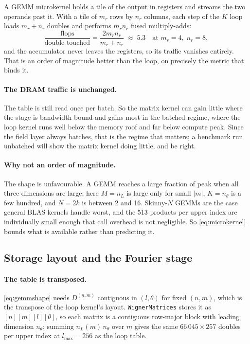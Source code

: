 \documentclass[11pt,a4paper]{article}
\newcommand{\code}[1]{\texttt{#1}}
\begin{document}
A GEMM microkernel holds a tile of the output in registers and streams the
two operands past it.  With a tile of $m_r$ rows by $n_r$ columns, each
step of the $K$ loop loads $m_r + n_r$ doubles and performs $m_r n_r$
fused multiply-adds:
\begin{equation}
  \frac{\text{flops}}{\text{double touched}}
    = \frac{2 m_r n_r}{m_r + n_r}
    \;\approx\; 5.3 \quad\text{at } m_r=4,\; n_r=8,
  \label{eq:microkernel}
\end{equation}
and the accumulator never leaves the registers, so its traffic vanishes
entirely.  That is an order of magnitude better than the loop, on
precisely the metric that binds it.

\paragraph{The DRAM traffic is unchanged.}  The table is still read once
per batch.  So the matrix kernel can gain little where the stage is
bandwidth-bound and gains most in the batched regime, where the loop
kernel runs well below the memory roof and far below compute peak.  Since
the field layer always batches, that is the regime that matters; a
benchmark run unbatched will show the matrix kernel doing little, and be
right.

\paragraph{Why not an order of magnitude.}  The shape is unfavourable.  A
GEMM reaches a large fraction of peak when all three dimensions are
large; here $M = n_L$ is large only for small $|m|$, $K = n_\theta$ is a
few hundred, and $N = 2k$ is between 2 and 16.  Skinny-$N$ GEMMs are the
case general BLAS kernels handle worst, and the 513 products per upper
index are individually small enough that call overhead is not negligible.
So \eqref{eq:microkernel} bounds what is available rather than predicting
it.

\subsection{Storage layout and the Fourier stage}
\label{sec:gemmlayout}

\paragraph{The table is transposed.}  \eqref{eq:gemmshape} needs
$D^{(n,m)}$ contiguous in $(l,\theta)$ for fixed $(n,m)$, which is the
transpose of the loop kernel's layout.  \code{WignerMatrices} stores it as
$[n][m][l][\theta]$, so each matrix is a contiguous row-major block with
leading dimension $n_\theta$; summing $n_L(m)\, n_\theta$ over $m$ gives
the same $66\,045 \times 257$ doubles per upper index at $l_{\max}=256$
as the loop table.
\end{document}
